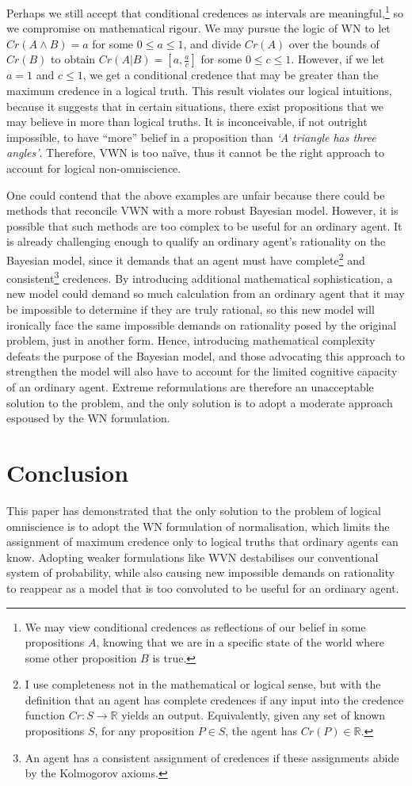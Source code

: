 \documentclass[12pt]{article}
\begin{document}
Perhaps we still accept that conditional credences as intervals are meaningful,\footnote{We may view conditional credences as reflections of our belief in some propositions $A$, knowing that we are in a specific state of the world where some other proposition $B$ is true.} so we compromise on mathematical rigour. We may pursue the logic of WN to let $Cr(A\land B)=a$ for some $0\leq a\leq1$, and divide $Cr(A)$ over the bounds of $Cr(B)$ to obtain $Cr(A|B)=[a,\frac{a}{c}]$ for some $0\leq c\leq1$. However, if we let $a=1$ and $c\leq 1$, we get a conditional credence that may be greater than the maximum credence in a logical truth. This result violates our logical intuitions, because it suggests that in certain situations, there exist propositions that we may believe in more than logical truths. It is inconceivable, if not outright impossible, to have ``more'' belief in a proposition than \textit{`A triangle has three angles'}. Therefore, VWN is too na\"ive, thus it cannot be the right approach to account for logical non-omniscience.

One could contend that the above examples are unfair because there could be methods that reconcile VWN with a more robust Bayesian model. However, it is possible that such methods are too complex to be useful for an ordinary agent. It is already challenging enough to qualify an ordinary agent's rationality on the Bayesian model, since it demands that an agent must have complete\footnote{I use completeness not in the mathematical or logical sense, but with the definition that an agent has complete credences if any input into the credence function $Cr:S\rightarrow\mathbb{R}$ yields an output. Equivalently, given any set of known propositions $S$, for any proposition $P\in S$, the agent has $Cr(P)\in\mathbb{R}$.} and consistent\footnote{An agent has a consistent assignment of credences if these assignments abide by the Kolmogorov axioms.} credences. By introducing additional mathematical sophistication, a new model could demand so much calculation from an ordinary agent that it may be impossible to determine if they are truly rational, so this new model will ironically face the same impossible demands on rationality posed by the original problem, just in another form. Hence, introducing mathematical complexity defeats the purpose of the Bayesian model, and those advocating this approach to strengthen the model will also have to account for the limited cognitive capacity of an ordinary agent. Extreme reformulations are therefore an unacceptable solution to the problem, and the only solution is to adopt a moderate approach espoused by the WN formulation.
\section{Conclusion}
This paper has demonstrated that the only solution to the problem of logical omniscience is to adopt the WN formulation of normalisation, which limits the assignment of maximum credence only to logical truths that ordinary agents can know. Adopting weaker formulations like WVN destabilises our conventional system of probability, while also causing new impossible demands on rationality to reappear as a model that is too convoluted to be useful for an ordinary agent.
\pagebreak
\printbibliography
\end{document}
